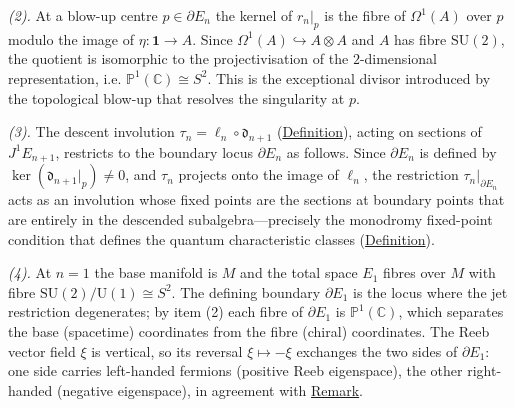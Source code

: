 \begin{proposition}
\emph{(2).} At a blow-up centre $p \in \partial E_n$ the kernel of
$r_n|_p$ is the fibre of $\Omega^1(A)$ over $p$ modulo the image of
$\eta\colon \mathbf{1} \to A$.  Since
$\Omega^1(A) \hookrightarrow A \otimes A$ and $A$ has fibre
$\mathrm{SU}(2)$, the quotient is isomorphic to the projectivisation of
the $2$-dimensional representation, i.e.
$\mathbb{P}^1(\mathbb{C}) \cong S^2$.  This is the exceptional divisor introduced
by the topological blow-up that resolves the singularity at $p$.

\emph{(3).} The descent involution $\tau_n = \ell_n \circ \mathfrak{d}_{n+1}$
(\hyperref[def:descent-involution]{Definition}), acting on sections of
$J^1 E_{n+1}$, restricts to the boundary locus $\partial E_n$ as follows.
Since $\partial E_n$ is defined by $\ker(\mathfrak{d}_{n+1}|_p) \neq 0$,
and $\tau_n$ projects onto the image of $\ell_n$, the restriction
$\tau_n|_{\partial E_n}$ acts as an involution whose fixed points are
the sections at boundary points that are entirely in the descended
subalgebra---precisely the monodromy fixed-point condition that
defines the quantum characteristic classes
(\hyperref[def:quantum-characteristic-classes]{Definition}).

\emph{(4).} At $n = 1$ the base manifold is $M$ and the total space
$E_1$ fibres over $M$ with fibre $\mathrm{SU}(2)/\mathrm{U}(1) \cong S^2$.
The defining boundary $\partial E_1$ is the locus where the jet
restriction degenerates; by item (2) each fibre of $\partial E_1$ is
$\mathbb{P}^1(\mathbb{C})$, which separates the base (spacetime) coordinates from the
fibre (chiral) coordinates.  The Reeb vector field $\xi$ is vertical, so
its reversal $\xi \mapsto -\xi$ exchanges the two sides of $\partial E_1$:
one side carries left-handed fermions (positive Reeb eigenspace), the other
right-handed (negative eigenspace), in agreement with
\hyperref[rem:descartes-chirality]{Remark}.
\end{proposition}
